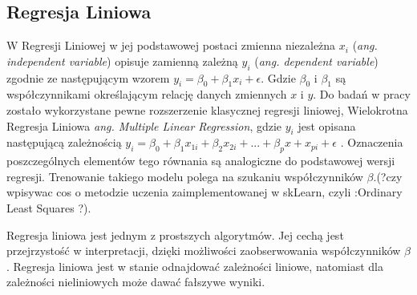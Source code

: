 \subsection{Regresja Liniowa}
W Regresji Liniowej w jej podstawowej postaci zmienna niezależna $x_i$ ({\em ang. independent variable}) opisuje zamienną zależną $y_i$ ({\em ang. dependent variable}) zgodnie ze następującym wzorem $y_i = \beta_0 + \beta_1 x_i + \epsilon$. Gdzie $\beta_0$ i $\beta_1$ są współczynnikami określającym relację danych zmiennych $x$ i $y$. Do badań w pracy zostało wykorzystane pewne rozszerzenie klasycznej regresji liniowej, Wielokrotna Regresja Liniowa {\em ang. Multiple Linear Regression}, gdzie $y_i$ jest opisana następującą zależnością $y_i = \beta_0 + \beta_1 x_{1i} + \beta_2 x_{2i} + ... + \beta_p x+x_{pi} + \epsilon $ \cite{mlr}. Oznaczenia poszczególnych elementów tego równania są analogiczne do podstawowej wersji regresji. Trenowanie takiego modelu polega na szukaniu współczynników $\beta$.(?czy wpisywac cos o metodzie uczenia zaimplementowanej w skLearn, czyli :Ordinary Least Squares ?).\par

Regresja liniowa jest jednym z prostszych algorytmów. Jej cechą jest przejrzystość w interpretacji, dzięki możliwości zaobserwowania współczynników $\beta$. Regresja liniowa jest w stanie odnajdować zależności liniowe, natomiast dla zależności nieliniowych może dawać fałszywe wyniki.


